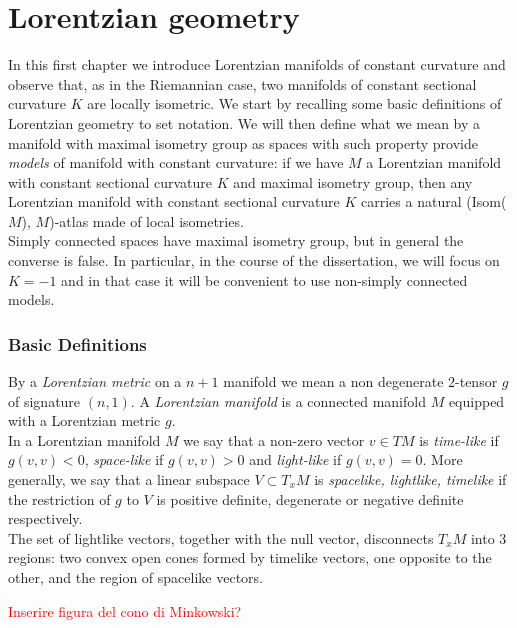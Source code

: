\chapter{Lorentzian geometry}

In this first chapter we introduce Lorentzian manifolds of constant curvature and observe that, as in the Riemannian case, two manifolds of constant sectional curvature $K$ are locally isometric. We start by recalling some basic definitions of Lorentzian geometry to set notation. We will then define what we mean by a manifold with maximal isometry group as spaces with such property provide \textit{models} of manifold with constant curvature: if we have $M$ a Lorentzian manifold with constant sectional curvature $K$ and maximal isometry group, then any Lorentzian manifold with constant sectional curvature $K$ carries a natural (Isom($M$), $M$)-atlas made of local isometries. \\
Simply connected spaces have maximal isometry group, but in general the converse is false. In particular, in the course of the dissertation, we will focus on $K=-1$ and in that case it will be convenient to use non-simply connected models. 

\subsection{Basic Definitions}
By a \textit{Lorentzian metric} on a $n+1$ manifold we mean a non degenerate $2$-tensor $g$ of signature $(n,1)$. A \textit{Lorentzian manifold} is a connected manifold $M$ equipped with a Lorentzian metric $g$.\\
In a Lorentzian manifold $M$ we say that a non-zero vector $v \in TM$ is \textit{time-like} if $g(v,v)<0$, \textit{space-like} if $g(v,v)>0$ and \textit{light-like} if $g(v,v)=0$. More generally, we say that a linear subspace $V \subset T_{x}M$ is \textit{spacelike, lightlike, timelike} if the restriction of $g$ to $V$ is positive definite, degenerate or negative definite respectively.\\
The set of lightlike vectors, together with the null vector, disconnects $T_{x}M$ into 3 regions: two convex open cones formed by timelike vectors, one opposite to the other, and the region of spacelike vectors. 

\textcolor{red}{Inserire figura del cono di Minkowski?}

